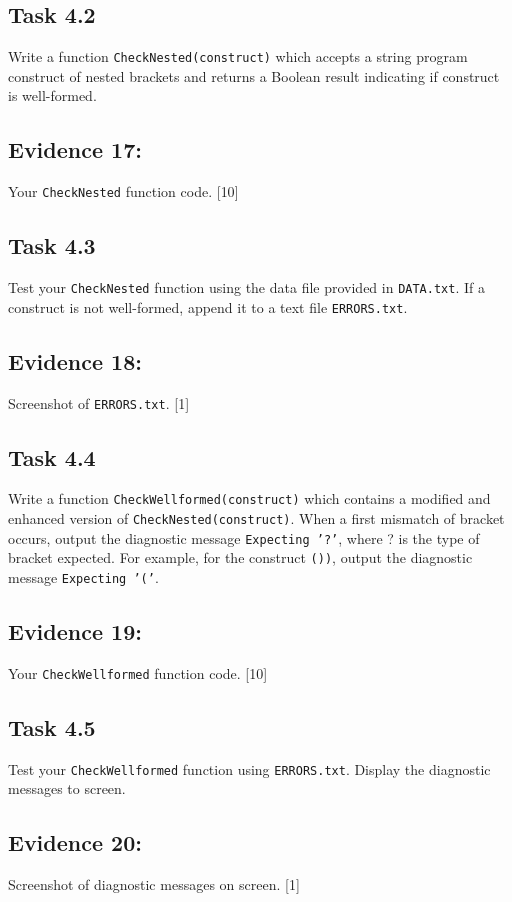\subsection*{Task 4.2 }

Write a function \texttt{CheckNested(construct)} which accepts a string
program construct of nested brackets and returns a Boolean result
indicating if construct is well-formed. 

\subsection*{Evidence 17: }

Your \texttt{CheckNested} function code. \hfill{}{[}10{]}

\subsection*{Task 4.3}

Test your \texttt{CheckNested} function using the data file provided
in \texttt{DATA.txt}. If a construct is not well-formed, append it
to a text file \texttt{ERRORS.txt}. 

\subsection*{Evidence 18: }

Screenshot of \texttt{ERRORS.txt}. \hfill{}{[}1{]}

\subsection*{Task 4.4}

Write a function \texttt{CheckWellformed(construct)} which contains
a modified and enhanced version of \texttt{CheckNested(construct)}.
When a first mismatch of bracket occurs, output the diagnostic message
\texttt{\textquotedbl Expecting '?'\textquotedbl}, where ? is the
type of bracket expected. For example, for the construct \texttt{())},
output the diagnostic message \texttt{\textquotedbl Expecting '('\textquotedbl}. 

\subsection*{Evidence 19: }

Your \texttt{CheckWellformed} function code. \hfill{}{[}10{]}

\subsection*{Task 4.5}

Test your \texttt{CheckWellformed} function using \texttt{ERRORS.txt}.
Display the diagnostic messages to screen.

\subsection*{Evidence 20: }

Screenshot of diagnostic messages on screen. \hfill{}{[}1{]}